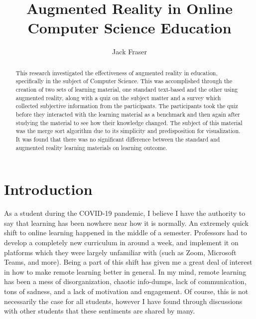 \documentclass[sigconf]{acmart}
\begin{document}
\title{Augmented Reality in Online Computer Science Education}

\author{Jack Fraser}

\renewcommand{\shortauthors}{Fraser}

\begin{abstract}
  This research investigated the effectiveness of augmented reality in education, specifically in the subject of Computer Science. This was accomplished through the creation of two sets of learning material, one standard text-based and the other using augmented reality, along with a quiz on the subject matter and a survey which collected subjective information from the participants. The participants took the quiz before they interacted with the learning material as a benchmark and then again after studying the material to see how their knowledge changed. The subject of this material was the merge sort algorithm due to its simplicity and predisposition for visualization. It was found that there was no significant difference between the standard and augmented reality learning materials on learning outcome.
\end{abstract}


\maketitle

\section{Introduction}
As a student during the COVID-19 pandemic, I believe I have the authority to say that learning has been nowhere near how it is normally. An extremely quick shift to online learning happened in the middle of a semester. Professors had to develop a completely new curriculum in around a week, and implement it on platforms which they were largely unfamiliar with (such as Zoom, Microsoft Teams, and more). Being a part of this shift has given me a great deal of interest in how to make remote learning better in general. In my mind, remote learning has been a mess of disorganization, chaotic info-dumps, lack of communication, tons of sadness, and a lack of motivation and engagement. Of course, this is not necessarily the case for all students, however I have found through discussions with other students that these sentiments are shared by many.
\end{document}
